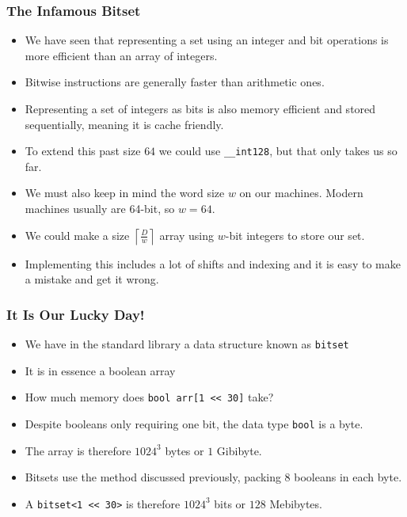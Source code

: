\documentclass[11pt]{beamer}
\begin{document}
\begin{frame}
    \frametitle{The Infamous Bitset}
    \begin{itemize}
        \item We have seen that representing a set using an integer and bit operations is more efficient than an array of integers.
        \item<2-> Bitwise instructions are generally faster than arithmetic ones.
        \item<3-> Representing a set of integers as bits is also memory efficient and stored sequentially, meaning it is cache friendly.
        \item<4-> To extend this past size $64$ we could use \texttt{\_\_int128}, but that only takes us so far.
        \item<5-> We must also keep in mind the word size $w$ on our machines. Modern machines usually are 64-bit, so $w=64$.
        \item<6-> We could make a size $\left\lceil \frac{D}{w} \right\rceil$ array using $w$-bit integers to store our set.
        \item<7-> Implementing this includes a lot of shifts and indexing and it is easy to make a mistake and get it wrong.
    \end{itemize}
\end{frame}

\begin{frame}
    \frametitle{It Is Our Lucky Day!}
    \begin{itemize}
        \item We have in the standard library a data structure known as \texttt{bitset}
        \item<2-> It is in essence a boolean array
        \item<3-> How much memory does \texttt{bool arr[1 << 30]} take?
        \item<4-> Despite booleans only requiring one bit, the data type \texttt{bool} is a byte.
        \item<5-> The array is therefore $1024^3$ bytes or $1$ Gibibyte.
        \item<6-> Bitsets use the method discussed previously, packing $8$ booleans in each byte.
        \item<7-> A \texttt{bitset<1 << 30>} is therefore $1024^3$ bits or $128$ Mebibytes.
    \end{itemize}
\end{frame}
\end{document}

